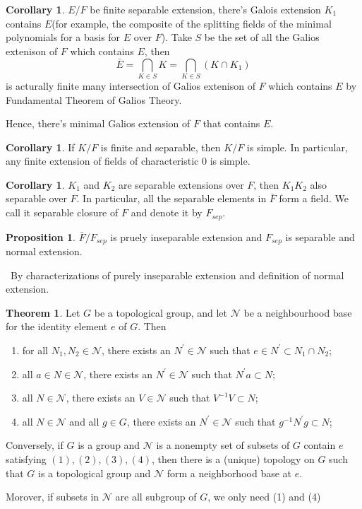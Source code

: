 \documentclass[a4paper,12pt]{article}
\newenvironment{prooff}{{\noindent\it\textcolor{cyan!40!black}{Proof}:}\,}{\par}
\theoremstyle{definition}
\newtheorem{coro}[defn]{Corollary}
\newtheorem{theo}[defn]{Theorem}
\newtheorem{prop}[defn]{Proposition}
\begin{document}
\begin{coro}
    $E/F$ be finite separable extension, there's Galois extension $K_1$ contains $E$(for example, the composite of the splitting fields of the minimal polynomials for a basis for $E$ over $F$). Take $S$ be the set of all the Galios extenison of $F$ which contains $E$, then
    \begin{equation*}
        \bar{E}=\bigcap_{K\in S} K =\bigcap_{K\in S} (K\cap K_1)
    \end{equation*}
    is acturally finite many intersection of Galios extenison of $F$ which contains $E$ by Fundamental Theorem of Galios Theory.

    Hence, there's minimal Galios extension of $F$ that contains $E$.
\end{coro}
\begin{coro}
    If $K/F$ is finite and separable, then $K / F$ is simple. In particular, any finite extension of fields of characteristic 0 is simple.
\end{coro}
\begin{coro}
    $K_1$ and $K_2$ are separable extensions over $F$, then $K_1K_2$ also separable over $F$. In particular, all the separable elements in $\bar{F}$ form a field. We call it separable closure of $F$ and denote it by $F_{sep}$.
\end{coro}
\begin{prop}
    $\bar{F}/F_{sep}$ is pruely inseparable extension and $F_{sep}$ is separable and normal extension.
\end{prop}
\begin{prooff}
    By characterizations of purely inseparable extension and definition of normal extension.
\end{prooff}
\begin{theo}
    Let $G$ be a topological group, and let $\mathcal{N}$ be a neighbourhood base for the identity element $e$ of $G$. Then
    \begin{enumerate}[(1)]
        \item for all $N_1, N_2 \in \mathcal{N}$, there exists an $N^{\prime} \in \mathcal{N}$ such that $e \in N^{\prime} \subset N_1 \cap N_2$;
        \item all $a\in N \in \mathcal{N}$, there exists an $N^{\prime} \in \mathcal{N}$ such that $N^{\prime}a \subset N$;
        \item all $N \in \mathcal{N}$, there exists an $V \in \mathcal{N}$ such that $V^{-1}V \subset N$;
        \item all $N \in \mathcal{N}$ and all $g \in G$, there exists an $N^{\prime} \in \mathcal{N}$ such that $g^{-1}N^{\prime}g \subset N$;
    \end{enumerate}
    Conversely, if $G$ is a group and $\mathcal{N}$ is a nonempty set of subsets of $G$ contain $e$ satisfying $(1), (2), (3), (4)$, then there is a (unique) topology on $G$ such that $G$ is a topological group and $\mathcal{N}$ form a neighborhood base at $e$.

    Morover, if subsets in $\mathcal{N}$ are all subgroup of $G$, we only need (1) and (4)
\end{theo}
\end{document}
